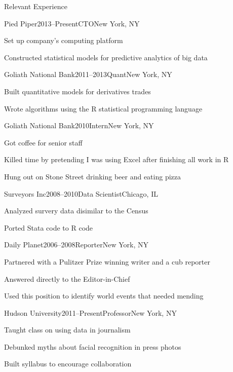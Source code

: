 \documentclass{resume}
\begin{document}
\begin{rSection}{Relevant Experience}

\begin{rSubsection}{Pied Piper}{2013--Present}{CTO}{New York, NY}
\item Set up company's computing platform
\item Constructed statistical models for predictive analytics of big data
\end{rSubsection}

\begin{rSubsection}{Goliath National Bank}{2011--2013}{Quant}{New York, NY}
\item Built quantitative models for derivatives trades
\item Wrote algorithms using the R statistical programming language
\end{rSubsection}

\begin{rSubsection}{Goliath National Bank}{2010}{Intern}{New York, NY}
\item Got coffee for senior staff
\item Killed time by pretending I was using Excel after finishing all work in R
\item Hung out on Stone Street drinking beer and eating pizza
\end{rSubsection}

\begin{rSubsection}{Surveyors Inc}{2008--2010}{Data Scientist}{Chicago, IL}
\item Analyzed survery data disimilar to the Census
\item Ported Stata code to R code
\end{rSubsection}

\begin{rSubsection}{Daily Planet}{2006--2008}{Reporter}{New York, NY}
\item Partnered with a Pulitzer Prize winning writer and a cub reporter
\item Answered directly to the Editor-in-Chief
\item Used this position to identify world events that needed mending
\end{rSubsection}

\begin{rSubsection}{Hudson University}{2011--Present}{Professor}{New York, NY}
\item Taught class on using data in journalism
\item Debunked myths about facial recognition in press photos
\item Built syllabus to encourage collaboration
\end{rSubsection}


\end{rSection}
\end{document}
